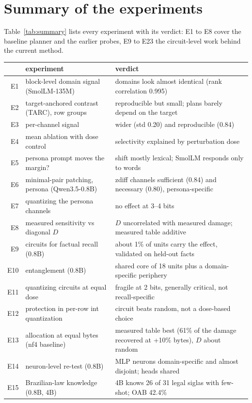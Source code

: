 \documentclass[11pt]{article}
\begin{document}
\section{Summary of the experiments}
\label{sec:summary}
Table~\ref{tab:summary} lists every experiment with its verdict: E1 to E8 cover the baseline planner and the earlier probes, E9 to E23 the circuit-level work behind the current method.
\begin{table}[h]
\centering\footnotesize
\begin{tabular}{@{}rp{5.3cm}p{8.2cm}@{}}
\toprule
 & experiment & verdict\\
\midrule
E1 & block-level domain signal (SmolLM-135M) & domains look almost identical (rank correlation 0.995)\\
E2 & target-anchored contrast (TARC), row groups & reproducible but small; plans barely depend on the target\\
E3 & per-channel signal & wider (std 0.20) and reproducible (0.84)\\
E4 & mean ablation with dose control & selectivity explained by perturbation dose\\
E5 & persona prompt moves the margin? & shift mostly lexical; SmolLM responds only to words\\
E6 & minimal-pair patching, persona (Qwen3.5-0.8B) & zdiff channels sufficient (0.84) and necessary (0.80), persona-specific\\
E7 & quantizing the persona channels & no effect at 3--4 bits\\
E8 & measured sensitivity vs diagonal $D$ & $D$ uncorrelated with measured damage; measured table additive\\
E9 & circuits for factual recall (0.8B) & about 1\% of units carry the effect, validated on held-out facts\\
E10 & entanglement (0.8B) & shared core of 18 units plus a domain-specific periphery\\
E11 & quantizing circuits at equal dose & fragile at 2 bits, generally critical, not recall-specific\\
E12 & protection in per-row int quantization & circuit beats random, not a dose-based choice\\
E13 & allocation at equal bytes (nf4 baseline) & measured table best (61\% of the damage recovered at +10\% bytes), $D$ about random\\
E14 & neuron-level re-test (0.8B) & MLP neurons domain-specific and almost disjoint; heads shared\\
E15 & Brazilian-law knowledge (0.8B, 4B) & 4B knows 26 of 31 legal siglas with few-shot; OAB 42.4\%\\

\end{tabular}
\end{table}
\end{document}
